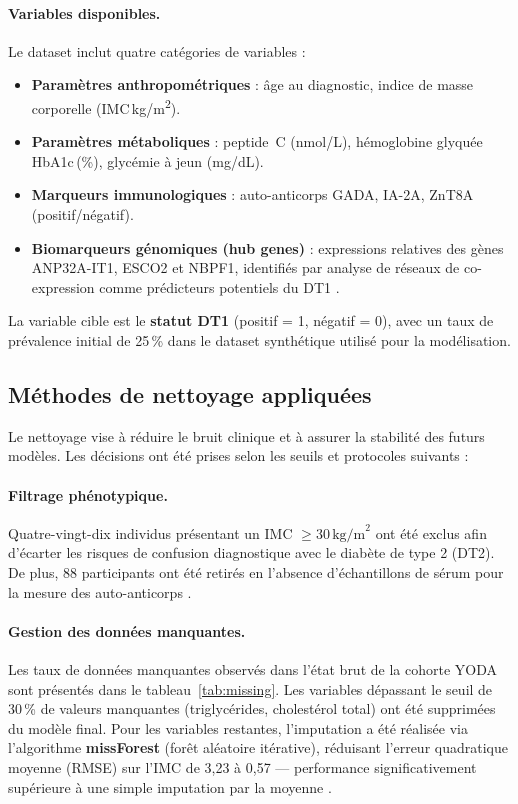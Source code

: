 \paragraph{Variables disponibles.}
Le dataset inclut quatre catégories de variables :
\begin{itemize}
    \item \textbf{Paramètres anthropométriques} : âge au diagnostic, indice de masse corporelle (IMC\,kg/m\textsuperscript{2}).
    \item \textbf{Paramètres métaboliques} : peptide~C (nmol/L), hémoglobine glyquée HbA1c\,(\%), glycémie à jeun (mg/dL).
    \item \textbf{Marqueurs immunologiques} : auto-anticorps GADA, IA-2A, ZnT8A (positif/négatif).
    \item \textbf{Biomarqueurs génomiques (hub genes)} : expressions relatives des gènes
          ANP32A-IT1, ESCO2 et NBPF1, identifiés par analyse de réseaux de co-expression
          comme prédicteurs potentiels du DT1 \cite{wang2023genemodel}.
\end{itemize}

La variable cible est le \textbf{statut DT1} (positif = 1, négatif = 0), avec un taux de
prévalence initial de 25\,\% dans le dataset synthétique utilisé pour la modélisation.

\subsection{Méthodes de nettoyage appliquées}
\label{subsec:nettoyage}

Le nettoyage vise à réduire le bruit clinique et à assurer la stabilité des futurs modèles.
Les décisions ont été prises selon les seuils et protocoles suivants \cite{dagliati2018ml,
sorelle2025demarche} :

\paragraph{Filtrage phénotypique.}
Quatre-vingt-dix individus présentant un IMC $\geq 30\,\text{kg/m}^2$ ont été exclus afin
d'écarter les risques de confusion diagnostique avec le diabète de type 2 (DT2). De plus,
88 participants ont été retirés en l'absence d'échantillons de sérum pour la mesure
des auto-anticorps \cite{katte2025lancet}.

\paragraph{Gestion des données manquantes.}
Les taux de données manquantes observés dans l'état brut de la cohorte YODA sont présentés
dans le tableau~\ref{tab:missing}. Les variables dépassant le seuil de 30\,\% de valeurs
manquantes (triglycérides, cholestérol total) ont été supprimées du modèle final.
Pour les variables restantes, l'imputation a été réalisée via l'algorithme
\textbf{missForest} (forêt aléatoire itérative), réduisant l'erreur quadratique
moyenne (RMSE) sur l'IMC de 3{,}23 à 0{,}57 — performance significativement
supérieure à une simple imputation par la moyenne \cite{dagliati2018ml}.


